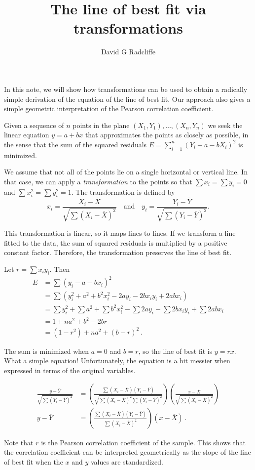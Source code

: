 \documentclass{article}
\begin{document}
\title{The line of best fit via transformations}
\author{David G Radcliffe}
\maketitle
\thispagestyle{empty}

In this note, we will show how transformations can be used to obtain
a radically simple derivation of the equation of the line of best fit.
Our approach also gives a simple geometric interpretation of the Pearson
correlation coefficient.

Given a sequence of $n$ points in the plane $(X_1, Y_1), \ldots, (X_n, Y_n)$
we seek the linear equation $y = a + bx$ that approximates the points
as closely as possible, in the sense that the sum of the squared residuals
$E = \sum_{i=1}^n (Y_i - a - bX_i)^2$ is minimized.

We assume that not all of the points lie on a single horizontal or vertical
line. In that case, we can apply a \emph{transformation} to the points
so that $\sum x_i = \sum y_i = 0$ and $\sum x_i^2 = \sum y_i^2 = 1$.
The transformation is defined by
$$
x_i = \frac{X_i - \overline{X}}{\sqrt{\sum (X_i - \overline{X})^2}}\quad\text{and}\quad
y_i = \frac{Y_i - \overline{Y}}{\sqrt{\sum (Y_i - \overline{Y})^2}}.
$$

This transformation is linear, so it maps lines to lines.
If we transform a line fitted to the data,
the sum of squared residuals is multiplied by a positive constant factor.
Therefore, the transformation preserves the line of best fit.


Let $r = \sum x_i y_i$. Then
\begin{align*}
E &= \sum (y_i - a - bx_i)^2 \\
&= \sum (y_i^2 + a^2 + b^2 x_i^2 - 2ay_i - 2bx_iy_i + 2abx_i) \\
&= \sum y_i^2 + \sum a^2 + \sum b^2 x_i^2 
 - \sum 2ay_i - \sum 2bx_iy_i + \sum 2abx_i \\
&= 1 + na^2 + b^2 - 2br \\
&= (1-r^2) + na^2 + (b - r)^2\ .
\end{align*}

The sum is minimized when $a = 0$ and $b = r$, so the line of best fit is
$y = rx$. What a simple equation!
Unfortunately, the equation is a bit messier when expressed in terms of the
original variables.

\begin{align*}
\frac{y - \overline{Y}}{\sqrt{\sum (Y_i - \overline{Y})^2}}
&= \left(
     \frac{\sum (X_i - \overline{X}) (Y_i - \overline{Y})}
          {\sqrt{\sum (X_i - \overline{X})^2 \sum (Y_i - \overline{Y})^2}}
   \right)
   \left(
     \frac{x - \overline{X}}
          {\sqrt{\sum (X_i - \overline{X})^2}}
   \right)\\
y - \overline{Y} &=
\left(
     \frac{\sum (X_i - \overline{X}) (Y_i - \overline{Y})}
          {\sum (X_i - \overline{X})^2}
   \right)
   (x - \overline{X})\ .
\end{align*}

Note that $r$ is the Pearson correlation coefficient of the sample.
This shows that the correlation coefficient can be interpreted geometrically
as the slope of the line of best fit when the $x$ and $y$ values are standardized.
\end{document}
